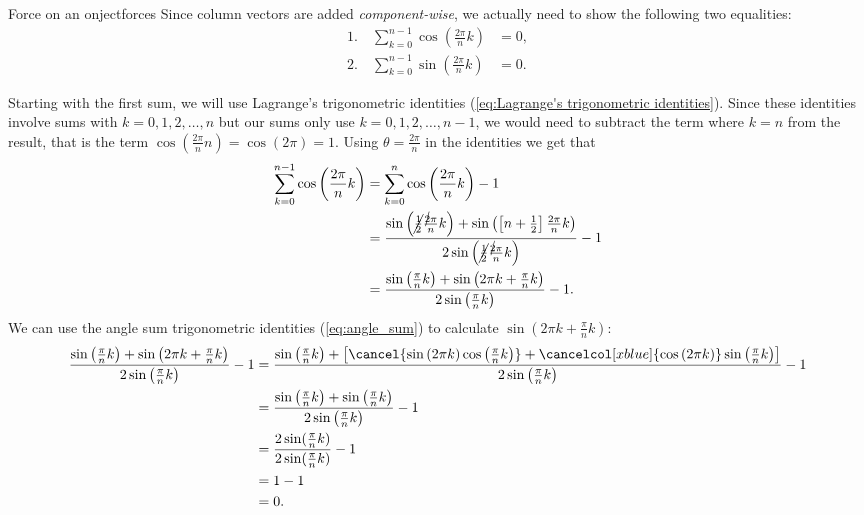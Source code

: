 \begin{example}{Force on an onject}{forces}
  Since column vectors are added \textit{component-wise}, we actually need to show the following two equalities:
  \begin{align*}
    1.\quad\sum\limits_{k=0}^{n-1}\cos\left(\frac{2\pi}{n}k\right) &= 0,\\
    2.\quad\sum\limits_{k=0}^{n-1}\sin\left(\frac{2\pi}{n}k\right) &= 0.
  \end{align*}

  Starting with the first sum, we will use Lagrange's trigonometric identities (\autoref{eq:Lagrange's trigonometric identities}). Since these identities involve sums with $k=0,1,2,\dots,n$ but our sums only use $k=0,1,2,\dots,n-1$, we would need to subtract the term where $k=n$ from the result, that is the term $\cos\left(\frac{2\pi}{n}n\right)=\cos\left(2\pi\right)=1$. Using $\theta=\frac{2\pi}{n}$ in the identities we get that
  \begin{align*}
    \sum\limits_{k=0}^{n-1}\cos\left( \frac{2\pi}{n}k \right) &= \sum\limits_{k=0}^{n}\cos\left( \frac{2\pi}{n}k \right)-1\\
                                                              &= \frac{\sin\left(\cancel{\frac{1}{2}}\frac{\cancel{2}\pi}{n}k\right)+\sin\left(\left[n+\frac{1}{2}\right]\frac{2\pi}{n}k\right)}{2\sin\left(\cancel{\frac{1}{2}}\frac{\cancel{2}\pi}{n}k\right)}-1\\
                                                              &= \frac{\sin\left(\frac{\pi}{n}k\right)+\sin\left(2\pi k+\frac{\pi}{n}k\right)}{2\sin\left(\frac{\pi}{n}k\right)}-1.
  \end{align*}
  We can use the angle sum trigonometric identities (\autoref{eq:angle_sum}) to calculate $\sin\left(2\pi k+\frac{\pi}{n}k\right)$:
  \begin{align*}
    \frac{\sin\left(\frac{\pi}{n}k\right)+\sin\left(2\pi k+\frac{\pi}{n}k\right)}{2\sin\left(\frac{\pi}{n}k\right)}-1 &= \frac{\sin\left(\frac{\pi}{n}k\right)+\left[\cancel{\sin\left(2\pi k\right)\cos\left(\frac{\pi}{n}k\right)}+\cancelcol[xblue]{\cos\left(2\pi k\right)}\sin\left(\frac{\pi}{n}k\right)\right]}{2\sin\left(\frac{\pi}{n}k\right)}-1\\
                                                                                                                      &= \frac{\sin\left(\frac{\pi}{n}k\right)+\sin\left(\frac{\pi}{n}k\right)}{2\sin\left(\frac{\pi}{n}k\right)}-1\\ 
                                                                                                                      &= \frac{2\sin(\frac{\pi}{n}k)}{2\sin(\frac{\pi}{n}k)} - 1\\
                                                                                                                      &= 1-1\\
                                                                                                                      &= 0.
  \end{align*}


\end{example}
